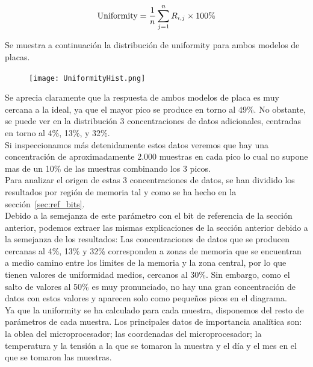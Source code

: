 \documentclass[spanish]{template/minim}
\begin{document}
\begin{equation}
    \centering
    \text{Uniformity} = \frac{1}{n} \sum\limits^n_{j=1} R_{i,j} \times 100\%
    \label{eq:uniformity}
\end{equation}


Se muestra a continuación la distribución de uniformity para ambos modelos de placas.\\

\begin{figure}[H]
    \centering
    \texttt{[image: UniformityHist.png]}
\end{figure}

Se aprecia claramente que la respuesta de ambos modelos de placa es muy cercana a la ideal, ya que el mayor pico se produce en torno al 49\%. No obstante, se puede ver en la distribución 3 concentraciones de datos adicionales, centradas en torno al 4\%, 13\%, y 32\%.\\

Si inspeccionamos más detenidamente estos datos veremos que hay una concentración de aproximadamente 2.000 muestras en cada pico lo cual no supone mas de un 10\% de las muestras combinando los 3 picos.\\

Para analizar el origen de estas 3 concentraciones de datos, se han dividido los resultados por región de memoria tal y como se ha hecho en la sección~\ref{sec:ref_bits}.\\

Debido a la semejanza de este parámetro con el bit de referencia de la sección anterior, podemos extraer las mismas explicaciones de la sección anterior debido a la semejanza de los resultados: Las concentraciones de datos que se producen cercanas al 4\%, 13\% y 32\% corresponden a zonas de memoria que se encuentran a medio camino entre los limites de la memoria y la zona central, por lo que tienen valores de uniformidad medios, cercanos al 30\%. Sin embargo, como el salto de valores al 50\% es muy pronunciado, no hay una gran concentración de datos con estos valores y aparecen solo como pequeños picos en el diagrama.\\

Ya que la uniformity se ha calculado para cada muestra, disponemos del resto de parámetros de cada muestra. Los principales datos de importancia analítica son: la oblea del microprocesador; las coordenadas del microprocesador; la temperatura y la tensión a la que se tomaron la muestra y el día y el mes en el que se tomaron las muestras.\\
\end{document}
